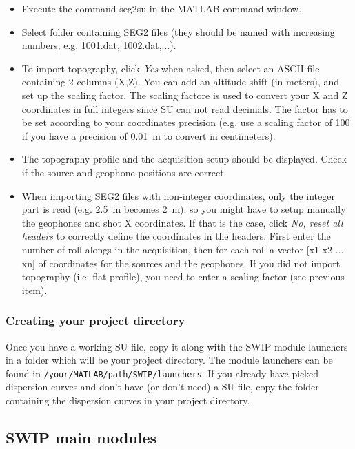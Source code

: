 \documentclass[twoside,a4paper]{article}
\begin{document}
\begin{itemize}
\setlength\itemsep{2ex}
\setlength{\parindent}{5ex}
\item Execute the command seg2su in the MATLAB command window.
\item Select folder containing SEG2 files (they should be named with increasing numbers; e.g. 1001.dat, 1002.dat,...).
\item To import topography, click \textit{Yes} when asked, then select an ASCII file containing 2 columns (X,Z). You can add an altitude shift (in meters), and set up the scaling factor. The scaling factore is used to convert your X and Z coordinates in full integers since SU can not read decimals. The factor has to be set according to your coordinates precision (e.g. use a scaling factor of 100 if you have a precision of 0.01~m to convert in centimeters).
\item The topography profile and the acquisition setup should be displayed. Check if the source and geophone positions are correct.
\item When importing SEG2 files with non-integer coordinates, only the integer part is read (e.g. 2.5~m becomes 2~m), so you might have to setup manually the geophones and shot X coordinates. If that is the case, click \textit{No, reset all headers} to correctly define the coordinates in the headers. First enter the number of roll-alongs in the acquisition, then for each roll a vector [x1 x2 ... xn] of coordinates for the sources and the geophones. If you did not import topography (i.e. flat profile), you need to enter a scaling factor (see previous item).
\end{itemize}

\subsubsection{Creating your project directory}
Once you have a working SU file, copy it along with the SWIP module launchers in a folder which will be your project directory. The module launchers can be found in \verb|/your/MATLAB/path/SWIP/launchers|. If you already have picked dispersion curves and don't have (or don't need) a SU file, copy the folder containing the dispersion curves in your project directory.

\subsection{SWIP main modules}
\end{document}

